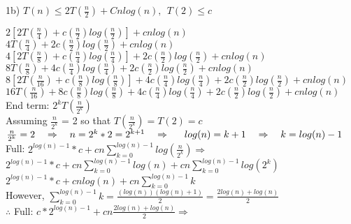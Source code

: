 \documentclass[12pt]{article}
\begin{document}
\noindent 1b) $T(n) \le 2T(\frac{n}{2}) + Cnlog(n),\ \ T(2) \le c$\\

\begin{adjustwidth}{.25in}{0in}


$2[2T(\frac{n}{4})+
c(\frac{n}{2})log(\frac{n}{2})] + 
cnlog(n)$\\
\noindent
$4T(\frac{n}{4})+
2c(\frac{n}{2})log(\frac{n}{2}) + 
cnlog(n)$\\


\noindent
$4[2T(\frac{n}{8})+
c(\frac{n}{4})log(\frac{n}{4})] + 
2c(\frac{n}{2})log(\frac{n}{2}) +
cnlog(n)$\\
\noindent
$8T(\frac{n}{8})+
4c(\frac{n}{4})log(\frac{n}{4}) + 
2c(\frac{n}{2})log(\frac{n}{2}) +
cnlog(n)$\\


\noindent
$8[2T(\frac{n}{16})+
c(\frac{n}{8})log(\frac{n}{8})] + 
4c(\frac{n}{4})log(\frac{n}{4}) + 
2c(\frac{n}{2})log(\frac{n}{2}) +
cnlog(n)$\\
\noindent
$16T(\frac{n}{16})+
8c(\frac{n}{8})log(\frac{n}{8}) + 
4c(\frac{n}{4})log(\frac{n}{4}) + 
2c(\frac{n}{2})log(\frac{n}{2}) +
cnlog(n)$\\


End term: $2^kT(\frac{n}{2^k})$ \\
\indent Assuming $\frac{n}{2^k}$ = 2 so that $T(\frac{n}{2^k})=T(2) = c$\\


$\frac{n}{2^k}=2\ \ \ \Rightarrow\ \ \ 
n=2^k*2=2^{k+1}\ \ \ \Rightarrow\\
\indent log(n)=k+1\ \ \ \Rightarrow\ \ \ 
k=log(n)-1$\\


\noindent Full: $2^{log(n)-1}*c + cn \sum_{k=0}^{log(n)-1}log(\frac{n}{2^k})\Rightarrow $\\
\indent $2^{log(n)-1}*c+ cn \sum_{k=0}^{log(n)-1}log(n)+ cn \sum_{k=0}^{log(n)-1}log(2^k)$\\
\indent $2^{log(n)-1}*c+ cnlog(n)+ cn \sum_{k=0}^{log(n)-1}k$\\

\noindent However, $\sum_{k=0}^{log(n)-1}k = \frac{(log(n))(log(n)+1)}{2} = \frac{2log(n)+log(n)}{2}$\\

\noindent$\therefore$ Full: $c*2^{log(n)-1}+ cn\frac{2log(n)+log(n)}{2} \Rightarrow$\\



\end{adjustwidth}
\end{document}
